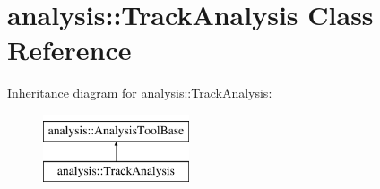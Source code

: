 \hypertarget{classanalysis_1_1TrackAnalysis}{\section{analysis\-:\-:Track\-Analysis Class Reference}
\label{classanalysis_1_1TrackAnalysis}
}
Inheritance diagram for analysis\-:\-:Track\-Analysis\-:\begin{figure}[H]
\begin{center}
\leavevmode
\includegraphics[height=2.000000cm]{classanalysis_1_1TrackAnalysis}
\end{center}
\end{figure}
